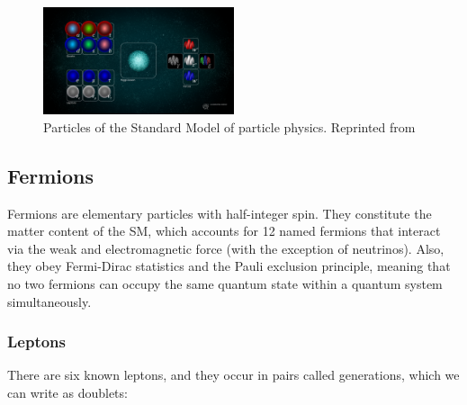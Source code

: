     \begin{figure}[h]
 	\centering
 	\includegraphics[width=0.5\textwidth]{figures/STDM.png}
 	\singlespace
 	\caption{Particles of the Standard Model of particle physics. Reprinted from \cite{StandardModelDiagram}}
 	\label{fig:stdmcer}
	\end{figure}

\subsection{Fermions}
Fermions are elementary particles with half-integer spin. They constitute the matter content of the SM, which accounts for 12 named fermions that interact via the weak and electromagnetic force (with the exception of neutrinos). Also, they obey Fermi-Dirac statistics and the Pauli exclusion principle, meaning that no two fermions can occupy the same quantum state within a quantum system simultaneously.



\subsubsection{Leptons}
There are six known leptons, and they occur in pairs called generations, which we can write as doublets:

